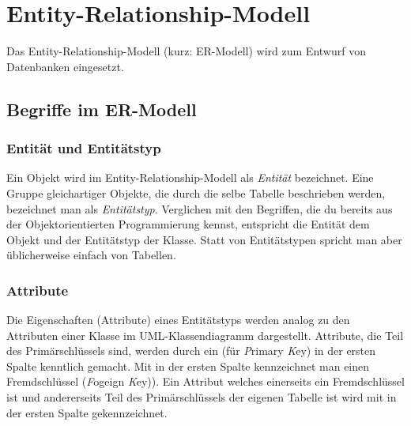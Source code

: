 \chapter{Entity-Relationship-Modell}
\renewcommand{\chaptertitle}{Entity-Relationship-Modell}

\lehead[]{\sf\hspace*{-2.00cm}\textcolor{white}{\colorbox{lightblue}{\makebox[1.60cm][r]{\thechapter}}}\hspace{0.17cm}\textcolor{lightblue}{\chaptertitle}}
\rohead[]{\textcolor{lightblue}{\chaptertitle}\sf\hspace*{0.17cm}\textcolor{white}{\colorbox{lightblue}{\makebox[1.60cm][l]{\thechapter}}}\hspace{-2.00cm}}
\rehead[]{\textcolor{lightblue}{AvHG, Inf, My}}
\lohead[]{\textcolor{lightblue}{AvHG, Inf, My}}


Das Entity-Relationship-Modell (kurz: ER-Modell) wird zum Entwurf von
Datenbanken eingesetzt.

\section{Begriffe im ER-Modell}

\subsection{Entität und Entitätstyp}

Ein Objekt wird im Entity-Relationship-Modell als \textit{Entität} bezeichnet.
Eine Gruppe gleichartiger Objekte, die durch die selbe Tabelle beschrieben 
werden, bezeichnet man als \textit{Entitätstyp}. Verglichen mit den Begriffen, 
die du bereits aus der Objektorientierten Programmierung kennst, entspricht die 
Entität dem Objekt und der Entitätstyp der Klasse. Statt von Entitätstypen
spricht man aber üblicherweise einfach von Tabellen.

\subsection{Attribute}

Die Eigenschaften (Attribute) eines Entitätstyps werden analog zu den Attributen
einer Klasse im UML-Klassendiagramm dargestellt. Attribute, die Teil des
Primärschlüssels sind, werden durch ein  (für
\textit{P}rimary \textit{K}ey) in der ersten Spalte kenntlich gemacht. Mit
 in der ersten Spalte kennzeichnet man einen Fremdschlüssel
(\textit{F}ogeign \textit{K}ey)). Ein Attribut welches einerseits ein
Fremdschlüssel ist und andererseits Teil des Primärschlüssels der eigenen
Tabelle ist wird mit  in der ersten Spalte gekennzeichnet.

